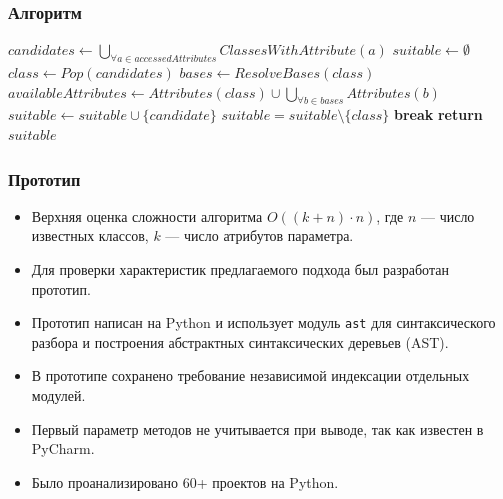 \documentclass[handout]{beamer}
\begin{document}
\begin{frame}[fragile]
  \frametitle{Алгоритм}

  \begin{algorithm}[H]
    \begin{algorithmic}[1]
    \scriptsize
      \State $candidates \gets \bigcup\limits_{\forall a \in accessedAttributes}
      ClassesWithAttribute(a)$
      \State $suitable \gets \emptyset$
        \State $class \gets Pop(candidates)$
        \State $bases \gets ResolveBases(class)$
        \State $availableAttributes \gets Attributes(class) \cup \bigcup\limits_{\forall{b} \in bases} Attributes(b)$
          \State $suitable \gets suitable \cup \{candidate\}$
        \EndIf
      \EndWhile
            \State $suitable = suitable \setminus \{ class \}$
            \State \textbf{break}
          \EndIf
        \EndFor
      \EndFor
    \State \textbf{return} $suitable$
    \EndFunction
    \end{algorithmic}
  \end{algorithm}

\end{frame}

\begin{frame}
  \frametitle{Прототип}

  \begin{itemize}
      \item Верхняя оценка сложности алгоритма $O((k + n) \cdot n)$, где $n$ ---
        число известных классов, $k$ --- число атрибутов параметра.

      \item Для проверки характеристик предлагаемого подхода был разработан прототип.

      \item Прототип написан на Python и использует модуль \texttt{ast} для
        синтаксического разбора и построения абстрактных синтаксических деревьев
        (AST).

      \item В прототипе сохранено требование независимой индексации отдельных
        модулей.

      \item Первый параметр методов не учитывается при выводе, так как известен
        в PyCharm.

      \item Было проанализировано 60+ проектов на Python.
  \end{itemize}
\end{frame}
\end{document}

